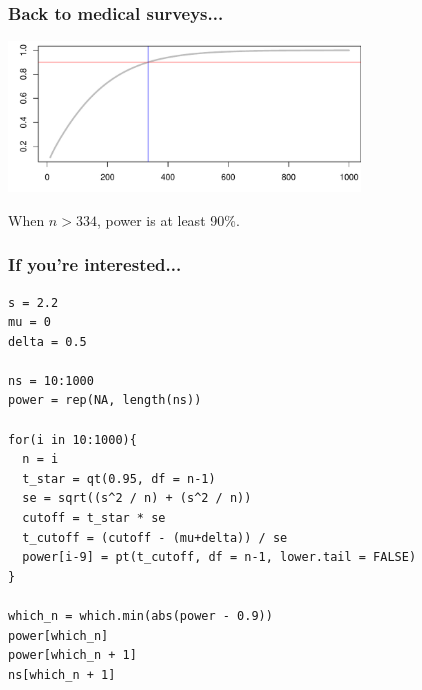 \documentclass[11pt,containsverbatim,handout,xcolor=xelatex,dvipsnames,table]{beamer}
\begin{document}
\begin{frame}
\frametitle{Back to medical surveys...}

{\small
{}}

\pause

\begin{center}
\includegraphics[width=0.7\textwidth]{figures/med_hist_surveys/power_curve.pdf}
\end{center}

When $n > 334$, power is at least 90\%.

\end{frame}


\begin{frame}[fragile]
\frametitle{If you're interested...}

{\scriptsize
\begin{verbatim}
s = 2.2
mu = 0
delta = 0.5

ns = 10:1000
power = rep(NA, length(ns))

for(i in 10:1000){
  n = i
  t_star = qt(0.95, df = n-1)
  se = sqrt((s^2 / n) + (s^2 / n))
  cutoff = t_star * se
  t_cutoff = (cutoff - (mu+delta)) / se
  power[i-9] = pt(t_cutoff, df = n-1, lower.tail = FALSE)
}

which_n = which.min(abs(power - 0.9))
power[which_n]
power[which_n + 1]
ns[which_n + 1]
\end{verbatim}
}

\end{frame}
\end{document}
